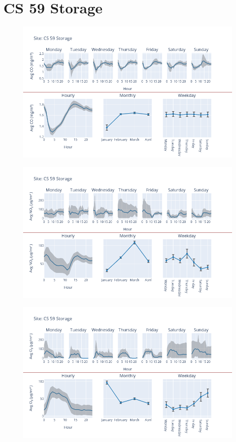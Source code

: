 \documentclass[12pt, oneside]{book}
\begin{document}
{\section{CS 59 Storage}
{\begin{figure}[H] 
 \centering 
\includegraphics[width=.88\textwidth, keepaspectratio]{image62} 
 \end{figure}}{} 

{\begin{figure}[H] 
 \centering 
\includegraphics[width=.88\textwidth, keepaspectratio]{image63} 
 \end{figure}}{} 

{\begin{figure}[H] 
 \centering 
\includegraphics[width=.88\textwidth, keepaspectratio]{image64} 
 \end{figure}}{} 

}
\end{document}

